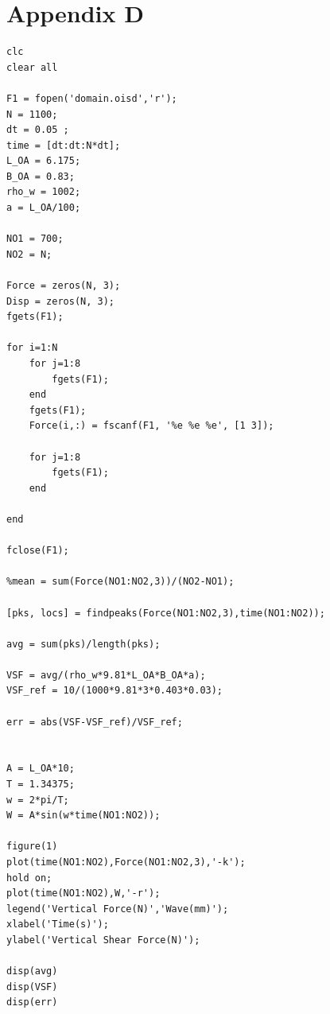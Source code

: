 \documentclass[12pt]{article} %
\begin{document}
\section{Appendix D}
\begin{verbatim}
clc
clear all

F1 = fopen('domain.oisd','r');
N = 1100;
dt = 0.05 ;
time = [dt:dt:N*dt];
L_OA = 6.175;
B_OA = 0.83;
rho_w = 1002;
a = L_OA/100;

NO1 = 700;
NO2 = N;

Force = zeros(N, 3); 
Disp = zeros(N, 3); 
fgets(F1);

for i=1:N
    for j=1:8
        fgets(F1);
    end
    fgets(F1); 
    Force(i,:) = fscanf(F1, '%e %e %e', [1 3]);
    
    for j=1:8
        fgets(F1);
    end
    
end

fclose(F1);

%mean = sum(Force(NO1:NO2,3))/(NO2-NO1);

[pks, locs] = findpeaks(Force(NO1:NO2,3),time(NO1:NO2));

avg = sum(pks)/length(pks);

VSF = avg/(rho_w*9.81*L_OA*B_OA*a);
VSF_ref = 10/(1000*9.81*3*0.403*0.03);

err = abs(VSF-VSF_ref)/VSF_ref;


A = L_OA*10;
T = 1.34375;
w = 2*pi/T;
W = A*sin(w*time(NO1:NO2));

figure(1)
plot(time(NO1:NO2),Force(NO1:NO2,3),'-k');
hold on;
plot(time(NO1:NO2),W,'-r');
legend('Vertical Force(N)','Wave(mm)');
xlabel('Time(s)');
ylabel('Vertical Shear Force(N)');

disp(avg)
disp(VSF)
disp(err)

\end{verbatim}
\end{document}
